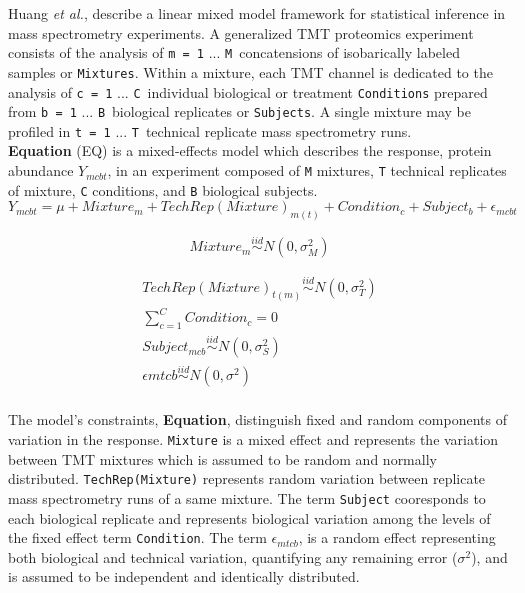 \documentclass[11pt]{elife}\usepackage[]{graphicx}\usepackage[]{color}
\begin{document}
Huang \textit{et al.}, describe a linear mixed model framework for
statistical inference in mass spectrometry experiments. A generalized TMT
proteomics experiment consists of the analysis of \texttt{m = 1} ... \texttt{M}\ 
concatensions of isobarically labeled samples or \texttt{Mixtures}. 
Within a mixture, each TMT channel is dedicated to the 
analysis of \texttt{c = 1} ... \texttt{C}\ individual biological or treatment 
\texttt{Conditions} prepared from \texttt{b = 1} ... \texttt{B}\ biological 
replicates or \texttt{Subjects}. A single mixture may be profiled in 
\texttt{t = 1} ... \texttt{T}\ technical replicate mass spectrometry runs.\\

\textbf{Equation} (EQ) is a mixed-effects model which describes the response, 
protein abundance $Y_{mcbt}$, in an experiment composed of \texttt{M} mixtures, 
\texttt{T} technical replicates of mixture, \texttt{C} conditions, and \texttt{B}
biological subjects.\\

\begin{equation}
	Y_{mcbt} = \mu + Mixture_m + TechRep(Mixture)_{m(t)} + Condition_c + 
	Subject_b + \epsilon_{mcbt}
\end{equation}

\begin{equation}
	Mixture_m \stackrel{iid}{\sim} N(0,\sigma^2_M)
\end{equation}

\begin{equation}
  \begin{gathered}
	TechRep(Mixture)_{t(m)} \stackrel{iid}{\sim} N(0,\sigma^2_T) \\
	\sum_{c=1}^{C} Condition_c = 0 \\
	Subject_{mcb} \stackrel{iid}{\sim} N(0,\sigma^2_S) \\
	\epsilon{mtcb} \stackrel{iid}{\sim} N(0,\sigma^2) \\
  \end{gathered}
\end{equation}

The model's constraints, \textbf{Equation}, distinguish fixed and random 
components of 
variation in the response. \texttt{Mixture} is a mixed effect and 
represents the variation between TMT mixtures which is assumed to be random 
and normally distributed. \texttt{TechRep(Mixture)} represents random variation 
between replicate mass spectrometry runs of a same mixture. 
The term \texttt{Subject} cooresponds to each biological replicate and 
represents biological variation among the levels of the fixed effect term
\texttt{Condition}. The term $\epsilon_{mtcb}$,
is a random effect representing both biological and technical variation, 
quantifying any remaining error ($\sigma^2$), and is assumed to be independent 
and identically distributed.\\
\end{document}

